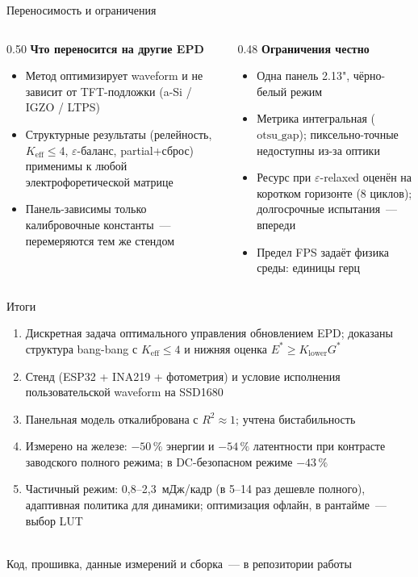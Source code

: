 \documentclass[aspectratio=169,11pt]{beamer}
\newcommand{\src}[1]{{\tiny\color{black!45}#1}}
\begin{document}
\begin{frame}{Переносимость и ограничения}
  \begin{columns}[T]
    \begin{column}{0.50\textwidth}
      \textbf{Что переносится на другие EPD}
      \begin{itemize}
        \item Метод оптимизирует waveform и не зависит от TFT-подложки (a-Si / IGZO / LTPS)
        \item Структурные результаты (релейность, $K_{\mathrm{eff}}\le4$, $\varepsilon$-баланс, partial+сброс) применимы к любой электрофоретической матрице
        \item Панель-зависимы только калибровочные константы~--- перемеряются тем же стендом
      \end{itemize}
    \end{column}
    \begin{column}{0.48\textwidth}
      \textbf{Ограничения честно}
      \begin{itemize}
        \item Одна панель 2.13", чёрно-белый режим
        \item Метрика интегральная ($\mathrm{otsu\_gap}$); пиксельно-точные недоступны из-за оптики
        \item Ресурс при $\varepsilon$-relaxed оценён на коротком горизонте (8 циклов); долгосрочные испытания~--- впереди
        \item Предел FPS задаёт физика среды: единицы герц
      \end{itemize}
    \end{column}
  \end{columns}
\end{frame}

\begin{frame}{Итоги}
  \begin{enumerate}
    \item Дискретная задача оптимального управления обновлением EPD; доказаны структура bang-bang с $K_{\mathrm{eff}}\le4$ и нижняя оценка $E^{*}\ge K_{\mathrm{lower}}G^{*}$
    \item Стенд (ESP32 + INA219 + фотометрия) и условие исполнения пользовательской waveform на SSD1680
    \item Панельная модель откалибрована с $R^2\approx1$; учтена бистабильность
    \item \alert{Измерено на железе: $-50\,\%$ энергии и $-54\,\%$ латентности при контрасте заводского полного режима}; в DC-безопасном режиме $-43\,\%$
    \item Частичный режим: 0{,}8--2{,}3~мДж/кадр (в 5--14 раз дешевле полного), адаптивная политика для динамики; оптимизация офлайн, в рантайме~--- выбор LUT
  \end{enumerate}
  \vspace{3mm}
  \\[1mm]
  \src{Код, прошивка, данные измерений и сборка~--- в репозитории работы}
\end{frame}
\end{document}
